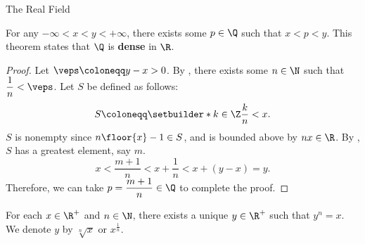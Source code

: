 \begin{section}{The Real Field}
\bigskip

\begin{theorem} \label{thm:QIsDenseInR}
    For any $- \infty < x < y < + \infty$, there exists some $p \in \Q$ such that $x < p < y$.
    This theorem states that $\Q$ is \textbf{dense} in $\R$.
\end{theorem}

\begin{proof}
    Let $\veps \coloneqq y - x > 0$. By , there exists some $n \in \N$
    such that $\dfrac{1}{n} < \veps$. Let $S$ be defined as follows:
    \[
    S \coloneqq \setbuilder*{k \in \Z}{\dfrac{k}{n} < x}.
    \]
    $S$ is nonempty since $n\floor{x} - 1 \in S$, and is bounded above by $nx \in \R$.
    By , $S$ has a greatest element, say $m$.
    \[
    x < \frac{m + 1}{n} < x + \frac{1}{n} < x + (y - x) = y.
    \]
    Therefore, we can take $p = \dfrac{m + 1}{n} \in \Q$ to complete the proof.
\end{proof}

\bigskip

\begin{theorem} \label{thm:ExistenceOfNthRoots}
    For each $x \in \R^{+}$ and $n \in \N$, there exists a unique $y \in \R^{+}$ such that
    $y^{n} = x$. We denote $y$ by $\sqrt[n]{x}$ or $x^{\frac{1}{n}}$.
\end{theorem}


\end{section}
